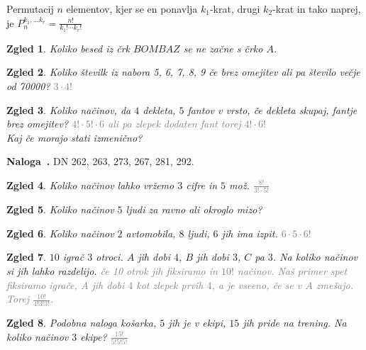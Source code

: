 \documentclass{article}
\newcounter{example}[section]
\newenvironment{example}[1][]{\refstepcounter{example}\par\medskip
   \noindent \textbf{Naloga~\theexample. #1} \rmfamily}{\medskip}
\newtheorem*{zgled}{Zgled}
\begin{document}
Permutacij $n$ elementov, kjer se en ponavlja $k_1$-krat, drugi $k_2$-krat in tako naprej, je $P_n ^{k_1,\ldots k_r}=\frac{n!}{k_1 ! \cdots k_r !}$

\begin{zgled}
    Koliko besed iz črk $BOMBAZ$ se ne začne s črko $A$.
\end{zgled}

\begin{zgled}
    Koliko številk iz nabora 5, 6, 7, 8, 9 če brez omejitev ali pa število večje od 70000? \textcolor{gray}{$3\cdot4!$}
\end{zgled}

\begin{zgled}
    Koliko načinov, da $4$ dekleta, $5$ fantov v vrsto, če dekleta skupaj, fantje brez omejitev? \textcolor{gray}{$4!\cdot 5!\cdot 6$ ali pa zlepek dodaten fant torej $4!\cdot 6!$}\\
    Kaj če morajo stati izmenično?
\end{zgled}

\begin{example}
    DN 262, 263, 273, 267, 281, 292.
\end{example}

\begin{zgled}
    Koliko načinov lahko vržemo $3$ cifre in $5$ mož. \textcolor{gray}{$\frac{8!}{3!\cdot 5!}$}
\end{zgled}

\begin{zgled}
    Koliko načinov $5$ ljudi za ravno ali okroglo mizo?
\end{zgled}

\begin{zgled}
    Koliko načinov $2$ avtomobila, $8$ ljudi, $6$ jih ima izpit. \textcolor{gray}{$6\cdot 5\cdot 6!$}
\end{zgled}

\begin{zgled}
    $10$ igrač $3$ otroci. $A$ jih dobi $4$, $B$ jih dobi $3$, $C$ pa $3$. Na koliko načinov si jih lahko razdelijo. \textcolor{gray}{če 10 otrok jih fiksiramo in $10!$ načinov. Naš primer spet fiksiramo igrače, $A$ jih dobi $4$ kot zlepek prvih $4$, a je vseeno, če se v $A$ zmešajo. Torej $\frac{10!}{4!3!3!}$.}
\end{zgled}

\begin{zgled}
    Podobna naloga košarka, $5$ jih je v ekipi, $15$ jih pride na trening. Na koliko načinov $3$ ekipe? \textcolor{gray}{$\frac{15!}{5!5!5!}$}
\end{zgled}
\end{document}
